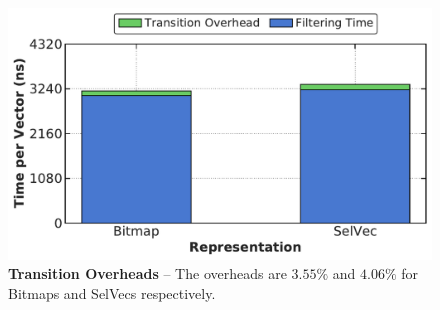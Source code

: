 \documentclass[12pt]{cmuthesis}
\begin{document}
\begin{figure}[t!]
    \centering
    \includegraphics[scale=0.5]{eval/transition.pdf}
    \caption{\textbf{Transition Overheads} -- The overheads are $3.55\%$ and $4.06\%$ for Bitmaps and SelVecs respectively.}
    \label{fig:disjunctive_filter_perf}
\end{figure}
\end{document}
